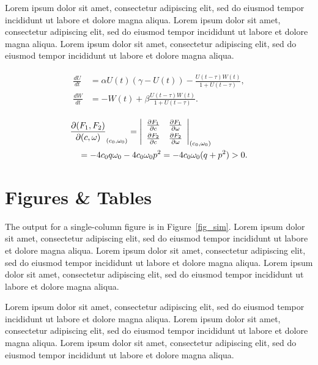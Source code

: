 \documentclass[
  journal=large,
  manuscript=物质及其变化,
  year=2020,
  volume=37,
]{cup-journal}
\begin{document}
Lorem ipsum dolor sit amet, consectetur adipiscing elit, sed do eiusmod tempor incididunt ut labore et dolore magna aliqua. Lorem ipsum dolor sit amet, consectetur adipiscing elit, sed do eiusmod tempor incididunt ut labore et dolore magna aliqua. Lorem ipsum dolor sit amet, consectetur adipiscing elit, sed do eiusmod tempor incididunt ut labore et dolore magna aliqua. 

\begin{align}\label{eq:another}
\begin{split}
\frac{dU}{dt} &=\alpha U(t)(\gamma -U(t))-\frac{U(t-\tau)W(t)}{1+U(t-\tau)},\\
\frac{dW}{dt} &=-W(t)+\beta\frac{U(t-\tau)W(t)}{1+U(t-\tau)}.
\end{split}
\end{align}


\begin{align*}
&\frac{\partial(F_1,F_2)}{\partial(c,\omega)}_{(c_0,\omega_0)} = \left|
\begin{array}{ll}
\frac{\partial F_1}{\partial c} &\frac{\partial F_1}{\partial \omega} \\\noalign{\vskip3pt}
\frac{\partial F_2}{\partial c}&\frac{\partial F_2}{\partial \omega}
\end{array}\right|_{(c_0,\omega_0)}\\
&\quad=-4c_0q\omega_0 -4c_0\omega_0p^2 =-4c_0\omega_0(q+p^2)>0.
\end{align*}


\section{Figures \& Tables}

The output for a single-column figure is in Figure~\ref{fig_sim}.  Lorem ipsum dolor sit amet, consectetur adipiscing elit, sed do eiusmod tempor incididunt ut labore et dolore magna aliqua. Lorem ipsum dolor sit amet, consectetur adipiscing elit, sed do eiusmod tempor incididunt ut labore et dolore magna aliqua. Lorem ipsum dolor sit amet, consectetur adipiscing elit, sed do eiusmod tempor incididunt ut labore et dolore magna aliqua. 

Lorem ipsum dolor sit amet, consectetur adipiscing elit, sed do eiusmod tempor incididunt ut labore et dolore magna aliqua. Lorem ipsum dolor sit amet, consectetur adipiscing elit, sed do eiusmod tempor incididunt ut labore et dolore magna aliqua. Lorem ipsum dolor sit amet, consectetur adipiscing elit, sed do eiusmod tempor incididunt ut labore et dolore magna aliqua. 
\end{document}
